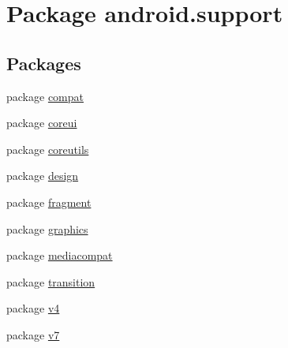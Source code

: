 \hypertarget{namespaceandroid_1_1support}{
\section{Package android.support}
\label{namespaceandroid_1_1support}
}
\subsection*{Packages}
\begin{CompactItemize}
\item 
package \hyperlink{namespaceandroid_1_1support_1_1compat}{compat}
\item 
package \hyperlink{namespaceandroid_1_1support_1_1coreui}{coreui}
\item 
package \hyperlink{namespaceandroid_1_1support_1_1coreutils}{coreutils}
\item 
package \hyperlink{namespaceandroid_1_1support_1_1design}{design}
\item 
package \hyperlink{namespaceandroid_1_1support_1_1fragment}{fragment}
\item 
package \hyperlink{namespaceandroid_1_1support_1_1graphics}{graphics}
\item 
package \hyperlink{namespaceandroid_1_1support_1_1mediacompat}{mediacompat}
\item 
package \hyperlink{namespaceandroid_1_1support_1_1transition}{transition}
\item 
package \hyperlink{namespaceandroid_1_1support_1_1v4}{v4}
\item 
package \hyperlink{namespaceandroid_1_1support_1_1v7}{v7}
\end{CompactItemize}
